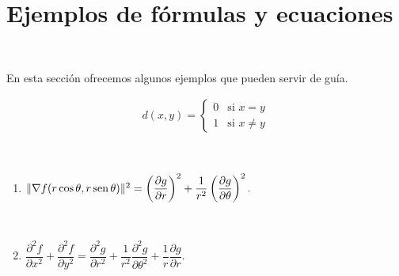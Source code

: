 \newpage

\section{Ejemplos de f\'ormulas y ecuaciones}

\

En esta secci\'on ofrecemos algunos ejemplos que pueden servir de gu\'ia.

\begin{align*}
d(x, y) =
\begin{cases}
0 &   \text{si $x = y$} \\
1 &   \text{si $x \ne y$}
\end{cases}
\end{align*}

\

\begin{enumerate}
\item $\| \nabla f (r \cos \theta, r \operatorname{sen} \theta) \|^2 = \left( \dfrac{\partial g}{\partial
r} \right)^2 + \dfrac{1}{r^2} \left( \dfrac{\partial g}{\partial \theta} \right)^2.$

\

\item $\dfrac{\partial^2 f }{\partial x^2} + \dfrac{\partial^2 f }{\partial y^2} =
\dfrac{\partial^2 g }{\partial r^2} + \dfrac{1}{r^2} \dfrac{\partial^2 g }{\partial \theta^2}
+ \dfrac{1}{r} \dfrac{\partial g }{\partial r}.$
\end{enumerate}

\

